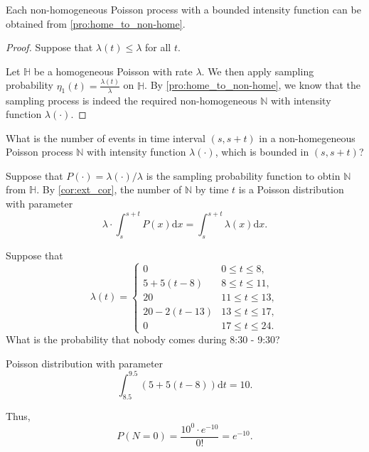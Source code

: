 \begin{proposition}
Each non-homogeneous Poisson process with a bounded intensity function can be obtained from \autoref{pro:home_to_non-home}.
\begin{proof}
Suppose that $ \lambda(t) \le \lambda $ for all $ t $.

Let $ \mathbb{H} $ be a homogeneous Poisson with rate $ \lambda $. We then apply sampling probability $ \eta_{1}(t) = \frac{\lambda(t)}{\lambda} $ on $ \mathbb{H} $. By \autoref{pro:home_to_non-home}, we know that the sampling process is indeed the required non-homogeneous $ \mathbb{N} $ with intensity function $ \lambda(\cdot) $.
\end{proof}
\end{proposition}

\begin{question}
What is the number of events in time interval $ (s, s + t) $ in a non-homegeneous Poisson process $ \mathbb{N} $ with intensity function $ \lambda(\cdot) $, which is bounded in $ (s, s + t) $?

Suppose that $ P(\cdot) = \lambda(\cdot) / \lambda $ is the sampling probability function to obtin $ \mathbb{N} $ from $ \mathbb{H} $. By \autoref{cor:ext_cor}, the number of $ \mathbb{N} $ by time $ t $ is a Poisson distribution with parameter
\[ \lambda \cdot \int_{s}^{s + t} P(x) \mathrm{d}x = \int_{s}^{s + t} \lambda(x) \mathrm{d}x. \]
\end{question}

\begin{example}
Suppose that
\[ \lambda(t) =
  \begin{cases}
    0               & 0 \le t \le 8, \\
    5 + 5(t - 8)    & 8 \le t \le 11, \\
    20              & 11 \le t \le 13, \\
    20 - 2(t - 13)  & 13 \le t \le 17, \\
    0               & 17 \le t \le 24.
  \end{cases} \]
What is the probability that nobody comes during 8:30 - 9:30?

Poisson distribution with parameter
\[ \int_{8.5}^{9.5} (5 + 5(t - 8)) \mathrm{d}t = 10. \]

Thus,
\[ P(N = 0) = \frac{10^{0} \cdot e^{-10}}{0!} = e^{-10}. \]
\end{example}
